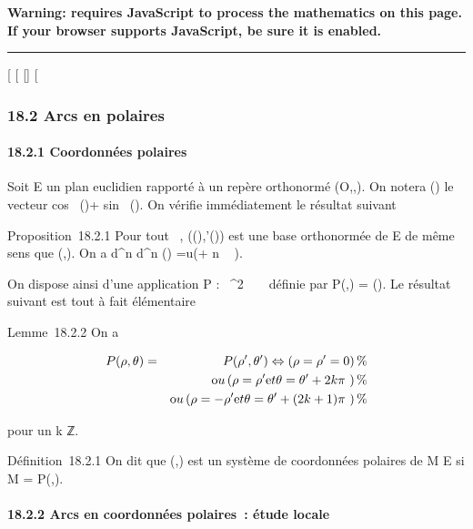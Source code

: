 \textbf{Warning: 
requires JavaScript to process the mathematics on this page.\\ If your
browser supports JavaScript, be sure it is enabled.}

\begin{center}\rule{3in}{0.4pt}\end{center}

{[}
{[}
{[}{]}
{[}

\subsubsection{18.2 Arcs en polaires}

\paragraph{18.2.1 Coordonnées polaires}

Soit E un plan euclidien rapporté à un repère orthonormé
(O,\vec\imath,). On notera
\vecu(\theta) le vecteur cos~
(\theta)\vec\imath + sin~
(\theta). On vérifie immédiatement le résultat
suivant

Proposition~18.2.1 Pour tout \theta \in {}~,
(\vecu(\theta),\vecu'(\theta)) est une base
orthonormée de E de même sens que
(\vec\imath,). On a 
d^n \over d\theta^n
\vecu(\theta) =\vec u(\theta + n \pi~
 ).

On dispose ainsi d'une application P : ~^2 \rightarrow~ ~ définie par
P(\rho,\theta) = \rho\vecu(\theta). Le résultat suivant est tout à
fait élémentaire

Lemme~18.2.2 On a

\begin{align*} P(\rho,\theta)& =& P(\rho',\theta')
\Leftrightarrow \left (\rho = \rho' =
0\right ) \%& \\ & &
\text ou \left (\rho =
\rho'\text et \theta = \theta' + 2k\pi~\right ) \%&
\\ & & \text ou
\left (\rho = -\rho'\text et \theta = \theta' + (2k
+ 1)\pi~\right )\%& \\
\end{align*}

pour un k \in ℤ.

Définition~18.2.1 On dit que (\rho,\theta) est un système de coordonnées
polaires de M \in E si M = P(\rho,\theta).

\paragraph{18.2.2 Arcs en coordonnées polaires~: étude locale}


